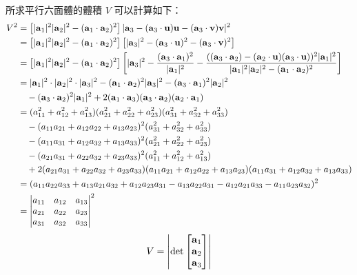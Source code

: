 所求平行六面體的體積 $V$ 可以計算如下：
\begin{align*}
V^2 &= \left[ |\boldsymbol{\mathbf{a}}_1|^2 |\boldsymbol{\mathbf{a}}_2|^2 - (\boldsymbol{\mathbf{a}}_1 \cdot \boldsymbol{\mathbf{a}}_2)^2 \right] |\boldsymbol{\mathbf{a}}_3 - (\boldsymbol{\mathbf{a}}_3 \cdot \boldsymbol{\mathbf{u}})\boldsymbol{\mathbf{u}} - (\boldsymbol{\mathbf{a}}_3 \cdot \boldsymbol{\mathbf{v}})\boldsymbol{\mathbf{v}}|^2 \\
&= \left[ |\boldsymbol{\mathbf{a}}_1|^2 |\boldsymbol{\mathbf{a}}_2|^2 - (\boldsymbol{\mathbf{a}}_1 \cdot \boldsymbol{\mathbf{a}}_2)^2 \right] \left[ |\boldsymbol{\mathbf{a}}_3|^2 - (\boldsymbol{\mathbf{a}}_3 \cdot \boldsymbol{\mathbf{u}})^2 - (\boldsymbol{\mathbf{a}}_3 \cdot \boldsymbol{\mathbf{v}})^2 \right] \\
&= \left[ |\boldsymbol{\mathbf{a}}_1|^2 |\boldsymbol{\mathbf{a}}_2|^2 - (\boldsymbol{\mathbf{a}}_1 \cdot \boldsymbol{\mathbf{a}}_2)^2 \right] \left[ |\boldsymbol{\mathbf{a}}_3|^2 - \dfrac{(\boldsymbol{\mathbf{a}}_3 \cdot \boldsymbol{\mathbf{a}}_1)^2}{|\boldsymbol{\mathbf{a}}_1|^2} - \dfrac{((\boldsymbol{\mathbf{a}}_3 \cdot \boldsymbol{\mathbf{a}}_2) - (\boldsymbol{\mathbf{a}}_2 \cdot \boldsymbol{\mathbf{u}})(\boldsymbol{\mathbf{a}}_3 \cdot \boldsymbol{\mathbf{u}}))^2 |\boldsymbol{\mathbf{a}}_1|^2}{|\boldsymbol{\mathbf{a}}_1|^2 |\boldsymbol{\mathbf{a}}_2|^2 - (\boldsymbol{\mathbf{a}}_1 \cdot \boldsymbol{\mathbf{a}}_2)^2} \right] \\
&= |\boldsymbol{\mathbf{a}}_1|^2 \cdot |\boldsymbol{\mathbf{a}}_2|^2 \cdot |\boldsymbol{\mathbf{a}}_3|^2 - (\boldsymbol{\mathbf{a}}_1 \cdot \boldsymbol{\mathbf{a}}_2)^2 |\boldsymbol{\mathbf{a}}_3|^2 - (\boldsymbol{\mathbf{a}}_3 \cdot \boldsymbol{\mathbf{a}}_1)^2 |\boldsymbol{\mathbf{a}}_2|^2 \\
&\quad - (\boldsymbol{\mathbf{a}}_3 \cdot \boldsymbol{\mathbf{a}}_2)^2 |\boldsymbol{\mathbf{a}}_1|^2 + 2(\boldsymbol{\mathbf{a}}_1 \cdot \boldsymbol{\mathbf{a}}_3)(\boldsymbol{\mathbf{a}}_3 \cdot \boldsymbol{\mathbf{a}}_2)(\boldsymbol{\mathbf{a}}_2 \cdot \boldsymbol{\mathbf{a}}_1) \\
&= (a_{11}^2 + a_{12}^2 + a_{13}^2)(a_{21}^2 + a_{22}^2 + a_{23}^2)(a_{31}^2 + a_{32}^2 + a_{33}^2) \\
&\quad - (a_{11}a_{21} + a_{12}a_{22} + a_{13}a_{23})^2 (a_{31}^2 + a_{32}^2 + a_{33}^2) \\
&\quad - (a_{11}a_{31} + a_{12}a_{32} + a_{13}a_{33})^2 (a_{21}^2 + a_{22}^2 + a_{23}^2) \\
&\quad - (a_{21}a_{31} + a_{22}a_{32} + a_{23}a_{33})^2 (a_{11}^2 + a_{12}^2 + a_{13}^2) \\
&\quad + 2(a_{21}a_{31} + a_{22}a_{32} + a_{23}a_{33})(a_{11}a_{21} + a_{12}a_{22} + a_{13}a_{23})(a_{11}a_{31} + a_{12}a_{32} + a_{13}a_{33}) \\
&= (a_{11}a_{22}a_{33} + a_{13}a_{21}a_{32} + a_{12}a_{23}a_{31} - a_{13}a_{22}a_{31} - a_{12}a_{21}a_{33} - a_{11}a_{23}a_{32})^2 \\
&= \begin{vmatrix}
a_{11} & a_{12} & a_{13} \\
a_{21} & a_{22} & a_{23} \\
a_{31} & a_{32} & a_{33}
\end{vmatrix}^2
\end{align*}
\[ V = \left| \det \begin{bmatrix} \boldsymbol{\mathbf{a}}_1 \\ \boldsymbol{\mathbf{a}}_2 \\ \boldsymbol{\mathbf{a}}_3 \end{bmatrix} \right| \]
